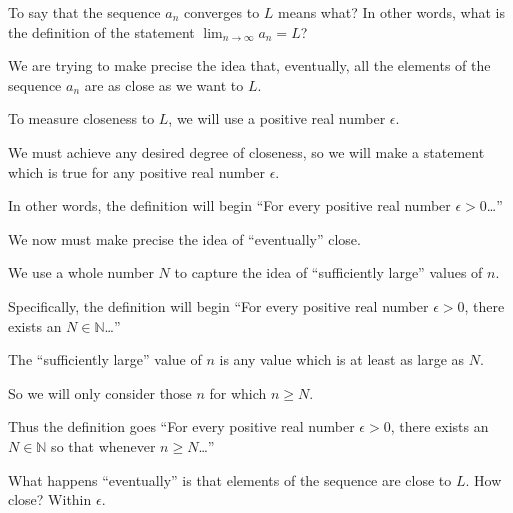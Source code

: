 \documentclass{ximera}
\begin{document}
\begin{question}
  To say that the sequence $a_n$ converges to $L$ means what?  In other words, what is the definition of the statement $\displaystyle\lim_{n \to \infty} a_n = L$?

    \begin{hint}
      We are trying to make precise the idea that, eventually, all the elements of the sequence $a_n$ are as close as we want to $L$.
    \end{hint}
    \begin{hint}
      To measure closeness to $L$, we will use a positive real number $\epsilon$.
    \end{hint}
    \begin{hint}
      We must achieve any desired degree of closeness, so we will make a statement which is true for any positive real number $\epsilon$.
    \end{hint}
    \begin{hint}
      In other words, the definition will begin ``For every positive real number $\epsilon > 0$\ldots''
    \end{hint}
    \begin{hint}
      We now must make precise the idea of ``eventually'' close.
    \end{hint}
    \begin{hint}
      We use a whole number $N$ to capture the idea of ``sufficiently large'' values of $n$.
    \end{hint}
    \begin{hint}
      Specifically, the definition will begin ``For every positive real number $\epsilon > 0$, there exists an $N \in \mathbb{N}$\ldots''
    \end{hint}
    \begin{hint}
      The ``sufficiently large'' value of $n$ is any value which is at least as large as $N$.
    \end{hint}
    \begin{hint}
      So we will only consider those $n$ for which $n \geq N$.
    \end{hint}
    \begin{hint}
      Thus the definition goes ``For every positive real number $\epsilon > 0$, there exists an $N \in \mathbb{N}$ so that whenever $n \geq N$\ldots''
    \end{hint}
    \begin{hint}
      What happens ``eventually'' is that elements of the sequence are close to $L$.  How close?  Within $\epsilon$.

\end{hint}
\end{question}
\end{document}

